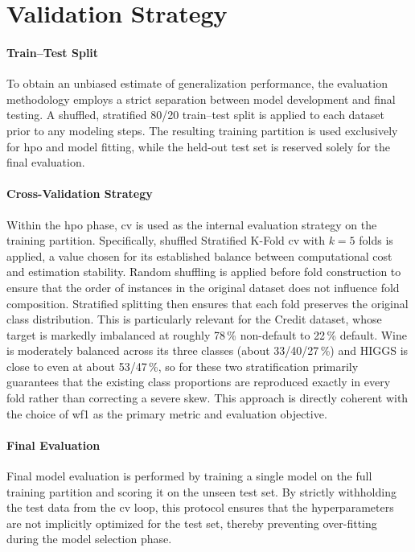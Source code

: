 \section{Validation Strategy}
\label{design_validation}

\paragraph{Train--Test Split}
To obtain an unbiased estimate of generalization performance, the evaluation methodology employs a strict separation between model development and final testing. A shuffled, stratified 80/20 train--test split is applied to each dataset prior to any modeling steps. The resulting training partition is used exclusively for \gls{hpo} and model fitting, while the held-out test set is reserved solely for the final evaluation.

\paragraph{Cross-Validation Strategy}
Within the \gls{hpo} phase, \gls{cv} is used as the internal evaluation strategy on the training partition. Specifically, shuffled Stratified K-Fold \gls{cv} with $k=5$ folds is applied, a value chosen for its established balance between computational cost and estimation stability. Random shuffling is applied before fold construction to ensure that the order of instances in the original dataset does not influence fold composition. Stratified splitting then ensures that each fold preserves the original class distribution. This is particularly relevant for the Credit dataset, whose target is markedly imbalanced at roughly 78\,\% non-default to 22\,\% default. Wine is moderately balanced across its three classes (about 33/40/27\,\%) and HIGGS is close to even at about 53/47\,\%, so for these two stratification primarily guarantees that the existing class proportions are reproduced exactly in every fold rather than correcting a severe skew. This approach is directly coherent with the choice of \gls{wf1} as the primary metric and evaluation objective.

\paragraph{Final Evaluation}
Final model evaluation is performed by training a single model on the full training partition and scoring it on the unseen test set. By strictly withholding the test data from the \gls{cv} loop, this protocol ensures that the hyperparameters are not implicitly optimized for the test set, thereby preventing over-fitting during the model selection phase.

